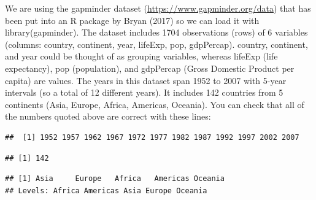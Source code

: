 \documentclass[
]{book}
\newenvironment{Shaded}{\begin{snugshade}}{\end{snugshade}}
\newcommand{\FunctionTok}[1]{\textcolor[rgb]{0.13,0.29,0.53}{\textbf{#1}}}
\newcommand{\NormalTok}[1]{#1}
\newcommand{\SpecialCharTok}[1]{\textcolor[rgb]{0.81,0.36,0.00}{\textbf{#1}}}
\begin{document}
We are using the gapminder dataset (\url{https://www.gapminder.org/data}) that has
been put into an R package by Bryan (2017) so we can load it with
library(gapminder). The dataset includes 1704 observations (rows) of 6 variables (columns: country,
continent, year, lifeExp, pop, gdpPercap). country, continent, and year could
be thought of as grouping variables, whereas lifeExp (life expectancy), pop
(population), and gdpPercap (Gross Domestic Product per capita) are values.
The years in this dataset span 1952 to 2007 with 5-year intervals (so a total of
12 different years). It includes 142 countries from 5 continents (Asia, Europe,
Africa, Americas, Oceania).
You can check that all of the numbers quoted above are correct with these
lines:

\begin{Shaded}
\end{Shaded}

\begin{verbatim}
##  [1] 1952 1957 1962 1967 1972 1977 1982 1987 1992 1997 2002 2007
\end{verbatim}

\begin{Shaded}
\end{Shaded}

\begin{verbatim}
## [1] 142
\end{verbatim}

\begin{Shaded}
\end{Shaded}

\begin{verbatim}
## [1] Asia     Europe   Africa   Americas Oceania 
## Levels: Africa Americas Asia Europe Oceania
\end{verbatim}
\end{document}

